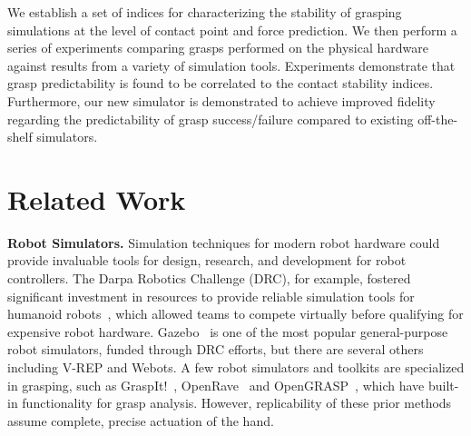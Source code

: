 We establish a set of indices for characterizing the stability of grasping simulations at the level of contact point and force prediction.  We then perform a series of experiments comparing grasps performed on the physical hardware against results from a variety of simulation tools. Experiments demonstrate that grasp predictability is found to be correlated to the contact stability indices.  Furthermore, our new simulator is demonstrated to achieve improved fidelity regarding the predictability of grasp success/failure compared to existing off-the-shelf simulators.  



\section{Related Work}
\label{relwork}


{\bf Robot Simulators.}
Simulation techniques for modern robot hardware could provide invaluable tools for design, research, and development for robot controllers.  The Darpa Robotics Challenge (DRC), for example, fostered significant investment in resources to provide reliable simulation tools for humanoid robots~\cite{Hsu14}, which allowed teams to compete virtually before qualifying for expensive robot hardware.  Gazebo~\cite{Koenig08} is one of the most popular general-purpose robot simulators, funded through DRC efforts, but there are several others including V-REP and Webots.  A few robot simulators and toolkits are specialized in grasping, such as GraspIt!~\cite{Miller04}, OpenRave~\cite{Diankov08OpenRAVE} and OpenGRASP~\cite{Leon10OpenGRASP}, which have built-in functionality for grasp analysis. However, replicability of these prior methods assume complete, precise actuation of the hand.

